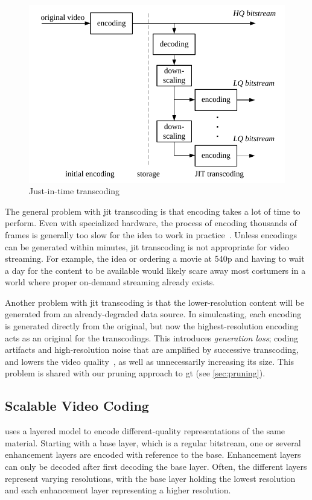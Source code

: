\begin{figure}
    \centering
	\includegraphics[scale=1.2]{pictures/visio/jit_transcoding}
    \caption{Just-in-time transcoding}
    \label{jit-transcoding}
\end{figure}

The general problem with \gls{jit} transcoding is that encoding takes a lot of time to perform. Even with specialized hardware, the process of encoding thousands of frames is generally too slow for the idea to work in practice~\cite{Rusert,Van_Wallendael}. Unless encodings can be generated within minutes, \gls{jit} transcoding is not appropriate for video streaming. For example, the idea or ordering a movie at 540p and having to wait a day for the content to be available would likely scare away most costumers in a world where proper on-demand streaming already exists.

Another problem with \gls{jit} transcoding is that the lower-resolution content will be generated from an already-degraded data source. In simulcasting, each encoding is generated directly from the original, but now the highest-resolution encoding acts as an original for the transcodings. This introduces \textit{generation loss}; coding artifacts and high-resolution noise that are amplified by successive transcoding, and lowers the video quality~\cite{Vetro}, as well as unnecessarily increasing its size. This problem is shared with our pruning approach to \gls{gt} (see \cref{sec:pruning}).

\subsection{Scalable Video Coding}
 uses a layered model to encode different-quality representations of the same material. Starting with a base layer, which is a regular bitstream, one or several enhancement layers are encoded with reference to the base. Enhancement layers can only be decoded after first decoding the base layer. Often, the different layers represent varying resolutions, with the base layer holding the lowest resolution and each enhancement layer representing a higher resolution.

